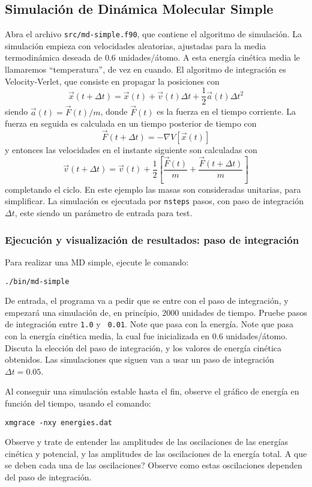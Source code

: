 \documentclass[10pt,a4paper,ssfamily]{exam}
\newcommand{\1}{{\bf 1}}
\newcommand{\2}{{\bf 2}}
\newcommand{\3}{{\bf 3}}
\newcommand{\command}[1]{\begin{center}{\tt #1}\end{center}}
\begin{document}
\pagestyle{empty}
\sffamily
\noindent

\subsection{Simulación de Dinámica Molecular Simple}

Abra el archivo {\tt src/md-simple.f90}, que contiene el algoritmo de
simulación. La simulación empieza con velocidades aleatorias, ajustadas
para la media termodinámica deseada de 0.6 unidades/átomo. A esta
energía cinética media le llamaremos ``temperatura'', de vez en cuando.
El algoritmo de integración es Velocity-Verlet, que consiste en propagar
la posiciones con
\[
\vec{x}(t+\Delta t) = \vec{x}(t) + \vec{v}(t)\Delta t + \frac{1}{2}\vec{a}(t)\Delta t^2
\]   
siendo $\vec{a}(t)=\vec{F}(t)/m$, donde $\vec{F}(t)$ es la fuerza en el tiempo corriente. 
La fuerza en seguida es calculada en un tiempo posterior de tiempo con
\[
\vec{F}(t+\Delta t) = -\nabla V[\vec{x}(t)]
\]
y entonces las velocidades en el instante siguiente son calculadas con
\[
\vec{v}(t+\Delta t) = \vec{v}(t) +
\frac{1}{2}\left[
\frac{\vec{F}(t)}{m}+\frac{\vec{F}(t+\Delta t)}{m}\right]
\]
completando el ciclo. En este ejemplo las masas son consideradas
unitarias, para simplificar. La simulación es ejecutada por {\tt nsteps}
pasos, con paso de integración $\Delta t$, este siendo un parámetro de
entrada para test. 

\subsubsection{Ejecución y visualización de resultados: paso de
integración} 

Para realizar una MD simple, ejecute le comando:
\command{./bin/md-simple} 
De entrada, el programa va a pedir que se
entre con el paso de integración, y empezará una simulación de, en princípio,
2000 unidades de tiempo.  Pruebe pasos de integración entre {\tt 1.0} y {\tt
0.01}. Note que pasa con la energía. Note que pasa con la energía
cinética media, la cual fue inicializada en 0.6 unidades/átomo. Discuta
la elección del paso de integración, y los valores de energía cinética
obtenidos. Las simulaciones que siguen van a usar un paso de integración
$\Delta t = 0.05$.

Al conseguir una simulación estable hasta
el fin, observe el gráfico de energía en función del tiempo, usando el
comando:
\command{xmgrace -nxy energies.dat}
Observe y trate de entender las amplitudes de las oscilaciones de las
energías cinética y potencial, y las amplitudes de las
oscilaciones de la energía total. A que se deben cada una de las
oscilaciones? Observe como estas oscilaciones dependen del paso de
integración.
\end{document}
